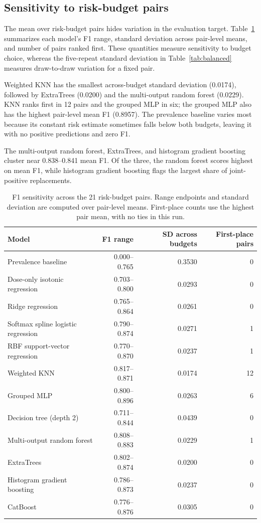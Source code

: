 \documentclass{article}
\begin{document}
\subsection{Sensitivity to risk-budget pairs}

The mean over risk-budget pairs hides variation in the evaluation target. Table~\ref{tab:budget-stability} summarizes each model's F1 range, standard deviation across pair-level means, and number of pairs ranked first. These quantities measure sensitivity to budget choice, whereas the five-repeat standard deviation in Table~\ref{tab:balanced} measures draw-to-draw variation for a fixed pair.

Weighted KNN has the smallest across-budget standard deviation (0.0174), followed by ExtraTrees (0.0200) and the multi-output random forest (0.0229). KNN ranks first in 12 pairs and the grouped MLP in six; the grouped MLP also has the highest pair-level mean F1 (0.8957). The prevalence baseline varies most because its constant risk estimate sometimes falls below both budgets, leaving it with no positive predictions and zero F1.

The multi-output random forest, ExtraTrees, and histogram gradient boosting cluster near 0.838--0.841 mean F1. Of the three, the random forest scores highest on mean F1, while histogram gradient boosting flags the largest share of joint-positive replacements.

\begin{table}[t]
\centering
\caption{F1 sensitivity across the 21 risk-budget pairs. Range endpoints and standard deviation are computed over pair-level means. First-place counts use the highest pair mean, with no ties in this run.}
\label{tab:budget-stability}
\small
\begin{tabular}{lrrr}
\toprule
Model & F1 range & SD across budgets & First-place pairs \\
\midrule
Prevalence baseline & 0.000--0.765 & 0.3530 & 0 \\
Dose-only isotonic regression & 0.703--0.800 & 0.0293 & 0 \\
Ridge regression & 0.765--0.864 & 0.0261 & 0 \\
Softmax spline logistic regression & 0.790--0.874 & 0.0271 & 1 \\
RBF support-vector regression & 0.770--0.870 & 0.0237 & 1 \\
Weighted KNN & 0.817--0.871 & 0.0174 & 12 \\
Grouped MLP & 0.800--0.896 & 0.0263 & 6 \\
Decision tree (depth 2) & 0.711--0.844 & 0.0439 & 0 \\
Multi-output random forest & 0.808--0.883 & 0.0229 & 1 \\
ExtraTrees & 0.802--0.874 & 0.0200 & 0 \\
Histogram gradient boosting & 0.786--0.873 & 0.0237 & 0 \\
CatBoost & 0.776--0.876 & 0.0305 & 0 \\
\bottomrule
\end{tabular}
\end{table}
\end{document}
